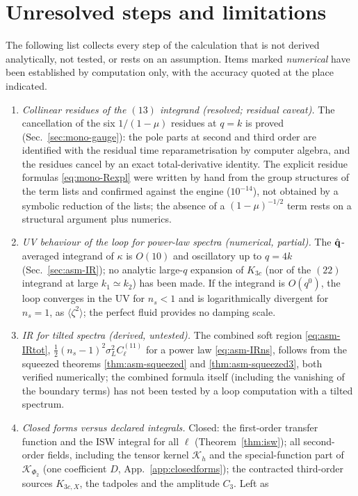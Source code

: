 \section{Unresolved steps and limitations}
\label{sec:unresolved}
The following list collects every step of the calculation that is not derived analytically, not tested, or rests on an assumption.
Items marked \emph{numerical} have been established by computation only, with the accuracy quoted at the place indicated.
\begin{enumerate}\itemsep3pt
\item \emph{Collinear residues of the $(13)$ integrand (resolved; residual caveat).}  The cancellation of the six $1/(1-\mu)$ residues at
$q=k$ is proved (Sec.~\ref{sec:mono-gauge}): the pole parts at second and third order are identified with the residual time reparametrisation by
computer algebra, and the residues cancel by an exact total-derivative identity.  The explicit residue formulas \eqref{eq:mono-Rexpl} were written by hand
from the group structures of the term lists and confirmed against the engine ($10^{-14}$), not obtained by a symbolic reduction of the lists; the
absence of a $(1-\mu)^{-1/2}$ term rests on a structural argument plus numerics.
\item \emph{UV behaviour of the loop for power-law spectra (numerical, partial).}  The $\hat{\mathbf q}$-averaged integrand of $\kappa$ is $O(10)$ and
oscillatory up to $q=4k$ (Sec.~\ref{sec:asm-IR}); no analytic large-$q$ expansion of $K_{3c}$ (nor of the $(22)$ integrand at large $k_1\simeq k_2$)
has been made.  If the integrand is $O(q^0)$, the loop converges in the UV for $n_s<1$ and is logarithmically divergent for $n_s=1$, as
$\langle\zeta^2\rangle$; the perfect fluid provides no damping scale.
\item \emph{IR for tilted spectra (derived, untested).}  The combined soft region \eqref{eq:asm-IRtot}, $\tfrac12(n_s-1)^2\sigma_L^2C^{(11)}_\ell$ for a power
law \eqref{eq:asm-IRns}, follows from the squeezed theorems \ref{thm:asm-squeezed} and \ref{thm:asm-squeezed3}, both verified numerically; the
combined formula itself (including the vanishing of the boundary terms) has not been tested by a loop computation with a tilted spectrum.
\item \emph{Closed forms versus declared integrals.}  Closed: the first-order transfer function and the ISW integral for all $\ell$
(Theorem~\ref{thm:isw}); all second-order fields, including the tensor kernel $\mathcal K_h$ and the special-function part of $\mathcal K_{\Phi_2}$
(one coefficient $D$, App.~\ref{app:closedforms}); the contracted third-order sources $K_{3c,X}$, the tadpoles and the amplitude $C_3$.  Left as

\end{enumerate}

